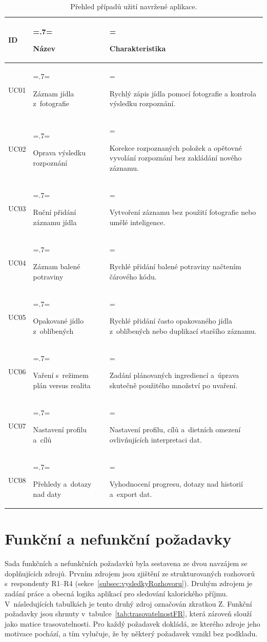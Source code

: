 \begin{table}[!ht]
	\centering
	\caption{Přehled případů užití navržené aplikace.}
	\label{tab:pripadyUziti}
	\begin{footnotesize}
	\renewcommand{\arraystretch}{1.35}
	\setlength{\tabcolsep}{4pt}
	\begin{tabularx}{\textwidth}{@{}l >{\hsize=.7\hsize\linewidth=\hsize\raggedright\arraybackslash}X >{\hsize=1.3\hsize\linewidth=\hsize\raggedright\arraybackslash}X@{}}
		\toprule
		\rowcolor{white}\textbf{ID} & \textbf{Název} & \textbf{Charakteristika} \\
		\midrule
		UC01 & Záznam jídla z~fotografie & Rychlý zápis jídla pomocí fotografie a kontrola výsledku rozpoznání. \\
		UC02 & Oprava výsledku rozpoznání & Korekce rozpoznaných položek a opětovné vyvolání rozpoznání bez zakládání nového záznamu. \\
		UC03 & Ruční přidání záznamu jídla & Vytvoření záznamu bez použití fotografie nebo umělé inteligence. \\
		UC04 & Záznam balené potraviny & Rychlé přidání balené potraviny načtením čárového kódu. \\
		UC05 & Opakované jídlo z~oblíbených & Rychlé přidání často opakovaného jídla z~oblíbených nebo duplikací staršího záznamu. \\
		UC06 & Vaření s~režimem plán versus realita & Zadání plánovaných ingrediencí a~úprava skutečně použitého množství po uvaření. \\
		UC07 & Nastavení profilu a~cílů & Nastavení profilu, cílů a~dietních omezení ovlivňujících interpretaci dat. \\
		UC08 & Přehledy a~dotazy nad daty & Vyhodnocení progresu, dotazy nad historií a~export dat. \\
		\bottomrule
	\end{tabularx}
	\end{footnotesize}
\end{table}

\section{Funkční a nefunkční požadavky}
\label{sec:pozadavky}

Sada funkčních a nefunkčních požadavků byla sestavena ze dvou navzájem se doplňujících zdrojů.
Prvním zdrojem jsou zjištění ze strukturovaných rozhovorů s~respondenty R1--R4 (sekce~\ref{subsec:vysledkyRozhovoru}).
Druhým zdrojem je zadání práce a obecná logika aplikací pro sledování kalorického příjmu.
V~následujících tabulkách je tento druhý zdroj označován zkratkou Z.
Funkční požadavky jsou shrnuty v~tabulce~\ref{tab:trasovatelnostFR}, která zároveň slouží jako matice trasovatelnosti.
Pro každý požadavek dokládá, ze kterého zdroje jeho motivace pochází, a tím vylučuje, že by některý požadavek vznikl bez podkladu.


